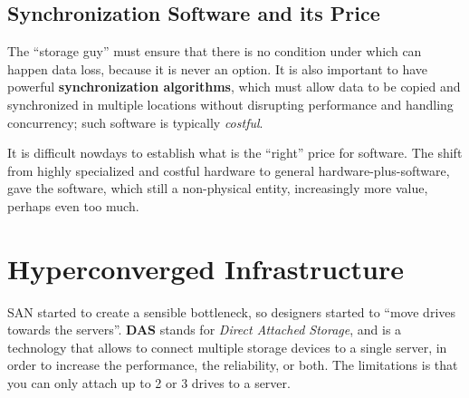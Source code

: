\subsection{Synchronization Software and its Price}
The ``storage guy'' must ensure that there is no condition under which can happen data loss, because it is never an option. It is also important to have powerful \textbf{synchronization algorithms}, which must allow data to be copied and synchronized in multiple locations without disrupting performance and handling concurrency;
such software is typically \textit{costful}.

It is difficult nowdays to establish what is the ``right'' price for software. The shift from highly specialized and costful hardware to general hardware-plus-software, gave the software, which still a non-physical entity, increasingly more value, perhaps even too much.


\section{Hyperconverged Infrastructure}
SAN started to create a sensible bottleneck, so designers started to ``move drives towards the servers''.
\textbf{DAS} stands for \textit{Direct Attached Storage}, and is a technology that allows to connect multiple storage devices to a single server, in order to increase the performance, the reliability, or both.
The limitations is that you can only attach up to 2 or 3 drives to a server.


